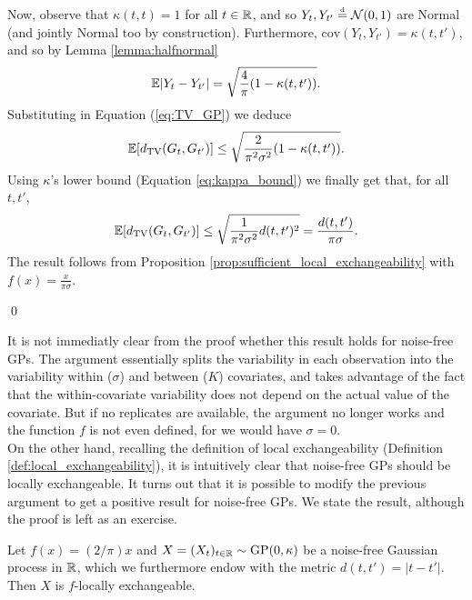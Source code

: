 Now, observe that $\kappa(t, t) = 1$ for all $t \in \mathbb{R}$, and so $Y_t, Y_{t'} \stackrel{\text{\rm\tiny d}}{=} \mathcal{N}(0, 1)$ are Normal (and jointly Normal too by construction). Furthermore, $\mathrm{cov}(Y_t, Y_{t'}) = \kappa(t, t')$, and so by Lemma \ref{lemma:halfnormal}
\begin{equation*}
	\mathbb{E} |Y_t - Y_{t'}| = \sqrt{\frac{4}{\pi}(1 - \kappa(t, t'))}.
\end{equation*}
Substituting in Equation (\ref{eq:TV_GP}) we deduce
\begin{equation} \label{eq:TV_GP_2}
	\mathbb{E} [d_{\mathrm{TV}} (G_t , G_{t'} )] \leq \sqrt{\frac{2}{\pi^2 \sigma^2}(1 - \kappa(t, t'))}.
\end{equation}
Using $\kappa$'s lower bound (Equation \ref{eq:kappa_bound}) we finally get that, for all $t, t'$,
\begin{equation}
	\mathbb{E} [d_{\mathrm{TV}} (G_t , G_{t'} )] \leq \sqrt{\frac{1}{\pi^2 \sigma^2}d(t, t')^2} = \frac{d(t, t')}{\pi \sigma}.
\end{equation}
The result follows from Proposition \ref{prop:sufficient_local_exchangeability} with $f(x) = \frac{x}{\pi \sigma}$.

\qed


\vskip 0.25cm

It is not immediatly clear from the proof whether this result holds for noise-free GPs. The argument essentially splits the variability in each observation into the variability within ($\sigma$) and between ($K$) covariates, and takes advantage of the fact that the within-covariate variability does not depend on the actual value of the covariate. But if no replicates are available, the argument no longer works and the function $f$ is not even defined, for we would have $\sigma = 0$. \\

On the other hand, recalling the definition of local exchangeability (Definition \ref{def:local_exchangeability}), it is intuitively clear that noise-free GPs should be locally exchangeable. It turns out that it is possible to modify the previous argument to get a positive result for noise-free GPs. We state the result, although the proof is left as an exercise.



\begin{proposition} \label{prop:GP_NF_local_exchangeable}
	Let $f(x) = (2/\pi) x$ and $X = (X_t)_{t \in \mathbb{R}} \sim \mathrm{GP} (0, \kappa)$ be a noise-free Gaussian process in $\mathbb{R}$, which we furthermore endow with the metric  $d(t, t') = |t-t'|$. Then $X$ is $f$-locally exchangeable.
\end{proposition}

